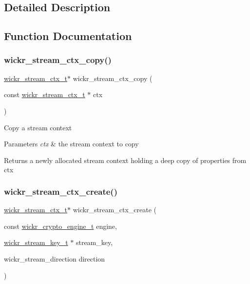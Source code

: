 \subsection{Detailed Description}


\subsection{Function Documentation}
\mbox{\label{group__wickr__stream_ga707b685e35eb437c33f5ec32c6760005}} 
\subsubsection{\texorpdfstring{wickr\+\_\+stream\+\_\+ctx\+\_\+copy()}{wickr\_stream\_ctx\_copy()}}
{\footnotesize\ttfamily \hyperlink{structwickr__stream__ctx}{wickr\+\_\+stream\+\_\+ctx\+\_\+t}$\ast$ wickr\+\_\+stream\+\_\+ctx\+\_\+copy (\begin{DoxyParamCaption}\item[{const \hyperlink{structwickr__stream__ctx}{wickr\+\_\+stream\+\_\+ctx\+\_\+t} $\ast$}]{ctx }\end{DoxyParamCaption})}

Copy a stream context


\begin{DoxyParams}{Parameters}
{\em ctx} & the stream context to copy \\
\hline
\end{DoxyParams}
\begin{DoxyReturn}{Returns}
a newly allocated stream context holding a deep copy of properties from \textquotesingle{}ctx\textquotesingle{} 
\end{DoxyReturn}
\mbox{\label{group__wickr__stream_ga0b5c513a3e0958dc7fd4f8455206e32e}} 
\subsubsection{\texorpdfstring{wickr\+\_\+stream\+\_\+ctx\+\_\+create()}{wickr\_stream\_ctx\_create()}}
{\footnotesize\ttfamily \hyperlink{structwickr__stream__ctx}{wickr\+\_\+stream\+\_\+ctx\+\_\+t}$\ast$ wickr\+\_\+stream\+\_\+ctx\+\_\+create (\begin{DoxyParamCaption}\item[{const \hyperlink{structwickr__crypto__engine}{wickr\+\_\+crypto\+\_\+engine\+\_\+t}}]{engine,  }\item[{\hyperlink{structwickr__stream__key}{wickr\+\_\+stream\+\_\+key\+\_\+t} $\ast$}]{stream\+\_\+key,  }\item[{wickr\+\_\+stream\+\_\+direction}]{direction }\end{DoxyParamCaption})}

